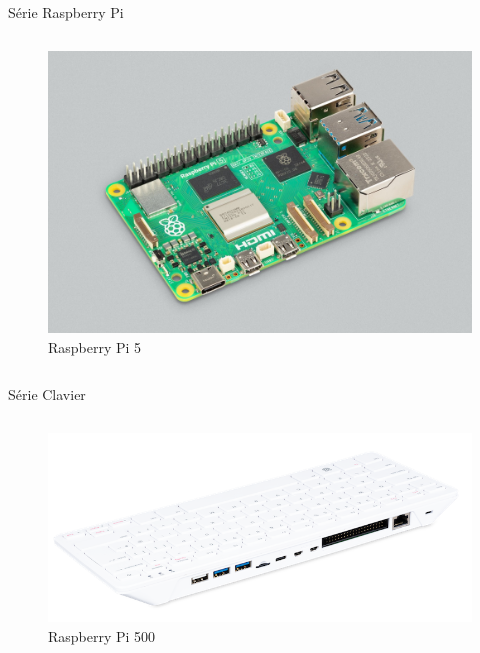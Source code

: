 \documentclass[aspectratio=169,xcolor=dvipsnames]{beamer}
\begin{document}
\begin{frame}{Série Raspberry Pi}
    \begin{columns}[c] %

        \begin{figure}
            \includegraphics[width=1\textheight]{images/rpi-5.jpg}
            \captionsetup{labelformat=empty}
            \caption{Raspberry Pi 5}
        \end{figure}

    \end{columns}
\end{frame}


\begin{frame}{Série Clavier}
    \begin{columns}[c] %

        \begin{figure}
            \includegraphics[width=1\textheight]{images/rpi-500.png}
            \captionsetup{labelformat=empty}
            \caption{Raspberry Pi 500}
        \end{figure}

    \end{columns}
\end{frame}
\end{document}
